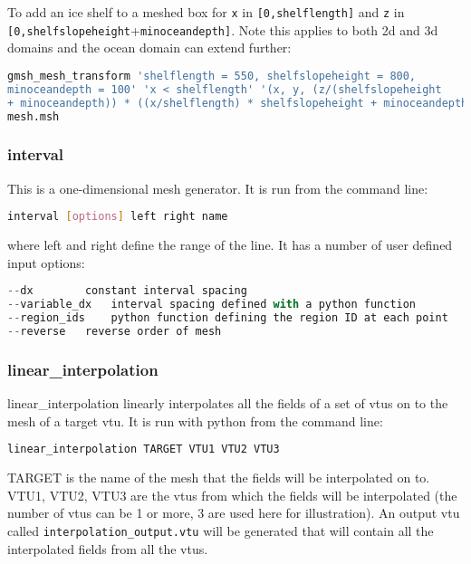 To add an ice shelf to a meshed box for \lstinline[language = Bash]+x+ in \lstinline[language = Bash]+[0,shelflength]+ and \lstinline[language = Bash]+z+ in \lstinline[language = Bash]+[0,shelfslopeheight++\lstinline[language = Bash]+minoceandepth]+. Note this applies to both 2d and 3d domains and the ocean domain can extend further:
\begin{lstlisting}[language = Bash]
gmsh_mesh_transform 'shelflength = 550, shelfslopeheight = 800, 
minoceandepth = 100' 'x < shelflength' '(x, y, (z/(shelfslopeheight 
+ minoceandepth)) * ((x/shelflength) * shelfslopeheight + minoceandepth))' 
mesh.msh
\end{lstlisting}


\subsubsection{interval}
\label{sect:interval}

This is a one-dimensional mesh generator. It is run from the command line:
\begin{lstlisting}[language = Bash]
interval [options] left right name 
\end{lstlisting}
where left and right define the range of the line. It has a number of user defined input options:

\begin{lstlisting}[language = Python]
--dx		constant interval spacing
--variable_dx	interval spacing defined with a python function
--region_ids	python function defining the region ID at each point
--reverse	reverse order of mesh
\end{lstlisting}


\subsubsection{linear\_interpolation}
\label{sect:scripts_linear_interpolation}
linear\_interpolation linearly interpolates all the fields of a set of vtus on to the mesh of a target vtu. It is run with python from the command line:
\begin{lstlisting}[language = Bash]
linear_interpolation TARGET VTU1 VTU2 VTU3 
\end{lstlisting}
TARGET is the name of the mesh that the fields will be interpolated on to. VTU1, VTU2, VTU3 are the vtus from which the fields will be interpolated (the number of vtus can be 1 or more, 3 are used here for illustration). An output vtu called \lstinline[language = Bash]+interpolation_output.vtu+ will be generated that will contain all the interpolated fields from all the vtus. 


